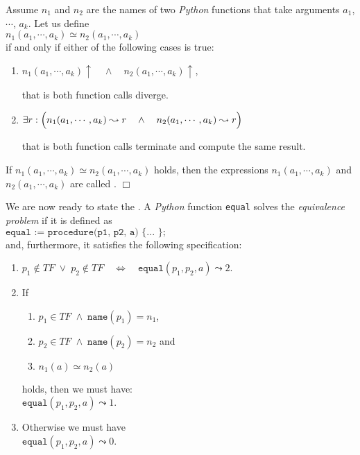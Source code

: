 \begin{Definition}[$\simeq$] 
Assume $n_1$ and $n_2$ are the names of two \textsl{Python} functions that take arguments
  $a_1$, $\cdots$, $a_k$.  Let us define \\[0.2cm]
\hspace*{1.3cm} 
$n_1(a_1,\cdots,a_k) \simeq n_2(a_1,\cdots,a_k)$ 
\\[0.2cm]
if and only if either of the following cases is true:
\begin{enumerate}
\item $n_1(a_1,\cdots,a_k)\uparrow \quad\wedge\quad n_2(a_1,\cdots,a_k)\uparrow$,

      that is both function calls diverge.
\item $\exists r: \Bigl(n_1(a_1,\cdots,a_k) \leadsto r \quad\wedge\quad n_2(a_1,\cdots,a_k) \leadsto
  r\Bigr)$

      that is both function calls terminate and compute the same result.
\end{enumerate}
If $n_1(a_1,\cdots,a_k) \simeq n_2(a_1,\cdots,a_k)$ holds, then the expressions $n_1(a_1,\cdots,a_k)$ and $n_2(a_1,\cdots,a_k)$ are called
. \hspace*{\fill} $\Box$
\end{Definition}

\noindent
We are now ready to state the .  A \textsl{Python} function \texttt{equal} solves the
\emph{equivalence problem} if it is defined as
\\[0.2cm]
\hspace*{1.3cm}
$\texttt{equal := procedure(p1, p2, a) \{ ... \};}$
\\[0.2cm]
and, furthermore, it satisfies the following specification:
\begin{enumerate}
\item $p_1 \not\in T\!F \;\vee\; p_2 \not\in T\!F \quad\Leftrightarrow\quad \mathtt{equal}(p_1, p_2, a) \leadsto 2$.
\item If 
      \begin{enumerate}
      \item $p_1 \in T\!F \;\wedge\; \mathtt{name}(p_1) = n_1$,
      \item $p_2 \in T\!F \;\wedge\; \mathtt{name}(p_2) = n_2$ \quad and
      \item $n_1(a) \simeq n_2(a)$
      \end{enumerate}
      holds, then we must have: 
      \\[0.2cm]
      \hspace*{1.3cm} 
      $\mathtt{equal}(p_1, p_2, a) \leadsto 1$.
\item Otherwise we must have \\[0.2cm]
      \hspace*{1.3cm} 
      $\mathtt{equal}(p_1, p_2, a) \leadsto 0$.
\end{enumerate}


